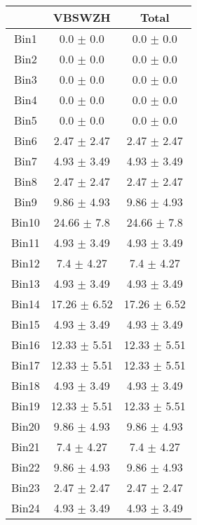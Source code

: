   \begin{tabular}{|c|c|c|}
  \hline
      & VBSWZH & Total \\ \cline{1-3} 
     \hline\hline
     Bin1 & 0.0 $\pm$ 0.0 & 0.0 $\pm$ 0.0 \\ \cline{1-3} 
     Bin2 & 0.0 $\pm$ 0.0 & 0.0 $\pm$ 0.0 \\ \cline{1-3} 
     Bin3 & 0.0 $\pm$ 0.0 & 0.0 $\pm$ 0.0 \\ \cline{1-3} 
     Bin4 & 0.0 $\pm$ 0.0 & 0.0 $\pm$ 0.0 \\ \cline{1-3} 
     Bin5 & 0.0 $\pm$ 0.0 & 0.0 $\pm$ 0.0 \\ \cline{1-3} 
     Bin6 & 2.47 $\pm$ 2.47 & 2.47 $\pm$ 2.47 \\ \cline{1-3} 
     Bin7 & 4.93 $\pm$ 3.49 & 4.93 $\pm$ 3.49 \\ \cline{1-3} 
     Bin8 & 2.47 $\pm$ 2.47 & 2.47 $\pm$ 2.47 \\ \cline{1-3} 
     Bin9 & 9.86 $\pm$ 4.93 & 9.86 $\pm$ 4.93 \\ \cline{1-3} 
     Bin10 & 24.66 $\pm$ 7.8 & 24.66 $\pm$ 7.8 \\ \cline{1-3} 
     Bin11 & 4.93 $\pm$ 3.49 & 4.93 $\pm$ 3.49 \\ \cline{1-3} 
     Bin12 & 7.4 $\pm$ 4.27 & 7.4 $\pm$ 4.27 \\ \cline{1-3} 
     Bin13 & 4.93 $\pm$ 3.49 & 4.93 $\pm$ 3.49 \\ \cline{1-3} 
     Bin14 & 17.26 $\pm$ 6.52 & 17.26 $\pm$ 6.52 \\ \cline{1-3} 
     Bin15 & 4.93 $\pm$ 3.49 & 4.93 $\pm$ 3.49 \\ \cline{1-3} 
     Bin16 & 12.33 $\pm$ 5.51 & 12.33 $\pm$ 5.51 \\ \cline{1-3} 
     Bin17 & 12.33 $\pm$ 5.51 & 12.33 $\pm$ 5.51 \\ \cline{1-3} 
     Bin18 & 4.93 $\pm$ 3.49 & 4.93 $\pm$ 3.49 \\ \cline{1-3} 
     Bin19 & 12.33 $\pm$ 5.51 & 12.33 $\pm$ 5.51 \\ \cline{1-3} 
     Bin20 & 9.86 $\pm$ 4.93 & 9.86 $\pm$ 4.93 \\ \cline{1-3} 
     Bin21 & 7.4 $\pm$ 4.27 & 7.4 $\pm$ 4.27 \\ \cline{1-3} 
     Bin22 & 9.86 $\pm$ 4.93 & 9.86 $\pm$ 4.93 \\ \cline{1-3} 
     Bin23 & 2.47 $\pm$ 2.47 & 2.47 $\pm$ 2.47 \\ \cline{1-3} 
     Bin24 & 4.93 $\pm$ 3.49 & 4.93 $\pm$ 3.49 \\ \cline{1-3} 

\end{tabular}
